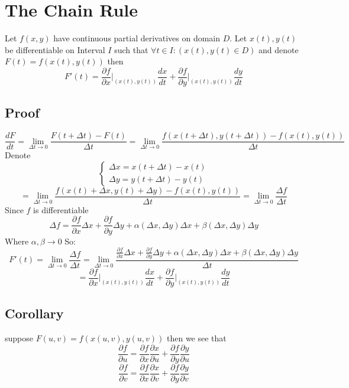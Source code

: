 \documentclass{article}
\begin{document}
	\newpage
	\section{The Chain Rule}
	Let $f(x,y)$ have continuous partial derivatives on domain $D$. Let $x(t),y(t)$ be differentiable on Interval $I$ such that $\forall t\in I:(x(t),y(t)\in D)$ and denote $F(t) = f(x(t),y(t))$ then
	\[
		F'(t) = \frac{\partial f}{\partial x}\biggr|_{(x(t),y(t))}\frac{dx}{dt} + \frac{\partial f}{\partial y}\biggr|_{(x(t),y(t))}\frac{dy}{dt}
	\]
	\subsection{Proof}
	\[
		\frac{dF}{dt} = \lim_{\Delta t\to 0}{\frac{F(t+\Delta t)-F(t)}{\Delta t}} = \lim_{\Delta t\to 0}{\frac{f(x(t+\Delta t),y(t+\Delta t))-f(x(t),y(t))}{\Delta t}} 
	\]
	Denote
	$$\begin{cases}
	  \Delta x = x(t+\Delta t) - x(t) \\
	  \Delta y = y(t+\Delta t) - y(t) 
	\end{cases}$$
	\[
		= \lim_{\Delta t\to 0}{\frac{f(x(t) + \Delta x,y(t)+\Delta y)-f(x(t),y(t))}{\Delta t}} 
		= \lim_{\Delta t\to 0}{\frac{\Delta f}{\Delta t}}
	\]
	Since $f$ is differentiable
	\[
		\Delta f = \frac{\partial f}{\partial x}\Delta x + \frac{\partial f}{\partial y}\Delta y + \alpha(\Delta x,\Delta y)\Delta x + \beta(\Delta x,\Delta y)\Delta y
	\]
	Where $\alpha,\beta\to 0 $ So:
	\[
		F'(t) = \lim_{\Delta t\to 0}{\frac{\Delta f}{\Delta t}} = \lim_{\Delta t\to 0}{\frac{\frac{\partial f}{\partial x}\Delta x + \frac{\partial f}{\partial y}\Delta y + \alpha(\Delta x,\Delta y)\Delta x + \beta(\Delta x,\Delta y)\Delta y}{\Delta t}}
	\]
	\[
		= \frac{\partial f}{\partial x}\biggr|_{(x(t),y(t))}\frac{dx}{dt} + \frac{\partial f}{\partial y}\biggr|_{(x(t),y(t))}\frac{dy}{dt}
	\]

	\subsection{Corollary}
	suppose $F(u,v) = f(x(u,v),y(u,v))$ then we see that
	\[
		\frac{\partial f}{\partial u} = \frac{\partial f}{\partial x}\frac{\partial x}{\partial u} + \frac{\partial f}{\partial y}\frac{\partial y}{\partial u}
	\]
	\[
		\frac{\partial f}{\partial v} = \frac{\partial f}{\partial x}\frac{\partial x}{\partial v} + \frac{\partial f}{\partial y}\frac{\partial y}{\partial v}
	\]


	\newpage
\end{document}
